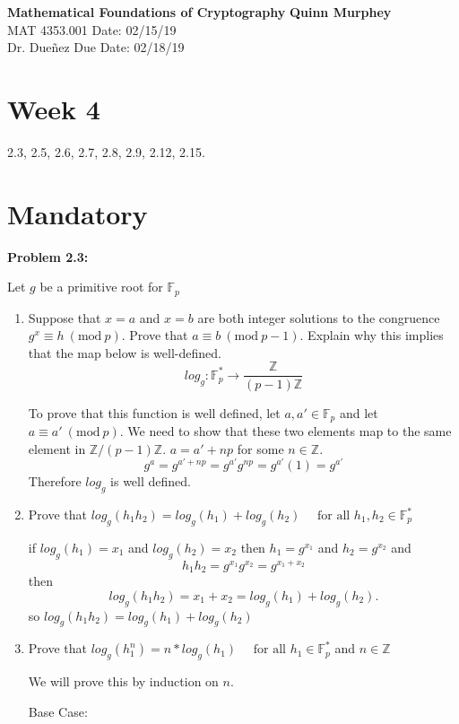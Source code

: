 \documentclass[a4paper, 11pt]{article}
\newcommand{\Mod}[1]{\ (\mathrm{mod}\ #1)}
\begin{document}
\noindent
\large\textbf{Mathematical Foundations of Cryptography} \hfill \textbf{Quinn Murphey} \\
\normalsize MAT 4353.001 \hfill Date: 02/15/19 \\
Dr. Dueñez \hfill Due Date: 02/18/19 \\
\noindent\makebox[\linewidth]{\rule{\paperwidth}{0.4pt}}
\section*{Week 4}
    2.3, 2.5, 2.6, 2.7, 2.8, 2.9, 2.12, 2.15.
    
\section*{Mandatory}

\noindent\textbf{Problem 2.3:}
    
    Let $g$ be a primitive root for $\mathbb{F}_p$
    \begin{enumerate}[label=(\alph*)]
        \item Suppose that $x=a$ and $x=b$ are both integer solutions to the congruence  $g^x \equiv h \Mod{p}$. Prove that $a\equiv b \Mod{p-1}$. Explain why this implies that the map below is well-defined.
        $$log_g:\mathbb{F}_p^* \rightarrow \frac{\mathbb{Z}}{(p-1)\mathbb{Z}}$$
        
        To prove that this function is well defined, let $a,a'\in\mathbb{F}_p$ and let $a\equiv a' \Mod{p}$. We need to show that these two elements map to the same element in $\mathbb{Z}/(p-1)\mathbb{Z}$. 
        $a=a'+ np$ for some $n\in\mathbb{Z}$.
        $$g^a=g^{a'+ np}=g^{a'}g^{np}=g^{a'}(1)=g^{a'}$$
        Therefore $log_g$ is well defined.
        
        \item Prove that $log_g(h_1h_2) = log_g(h_1) + log_g(h_2) \quad\text{ for all } h_1,h_2\in\mathbb{F}_p^*$
        
        if $log_g(h_1)= x_1 $ and $log_g(h_2)=x_2$ then $h_1=g^{x_1}$ and $h_2=g^{x_2}$ and $$h_1h_2 = g^{x_1}g^{x_2} = g^{x_1+x_2}$$ then $$log_g(h_1h_2) = x_1+x_2 = log_g(h_1)+log_g(h_2).$$
        so $log_g(h_1h_2) = log_g(h_1)+log_g(h_2)$
        
        \item Prove that $log_g(h_1^n) = n*log_g(h_1) \quad\text{ for all } h_1\in\mathbb{F}_p^*$ and $n\in\mathbb{Z}$
        
        We will prove this by induction on $n$.
        
        Base Case: 
        
    \end{enumerate}
    
\end{document}
